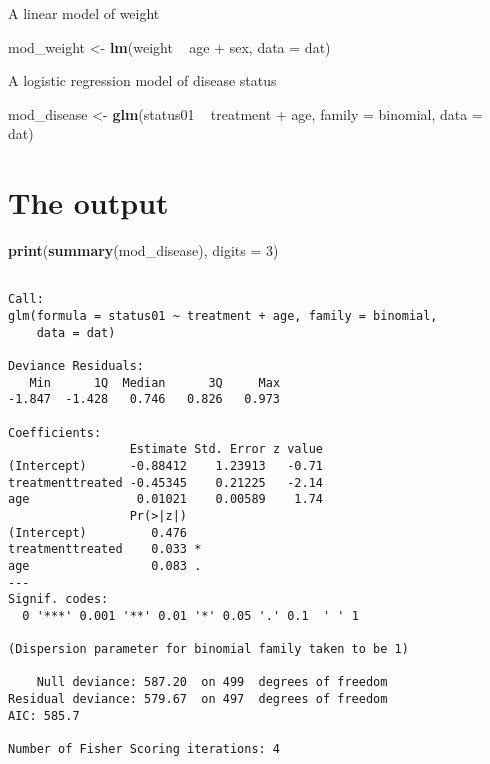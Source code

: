 \documentclass[]{tufte-handout}
\newenvironment{Shaded}{}{}
\newcommand{\DataTypeTok}[1]{\textcolor[rgb]{0.56,0.13,0.00}{#1}}
\newcommand{\DecValTok}[1]{\textcolor[rgb]{0.25,0.63,0.44}{#1}}
\newcommand{\KeywordTok}[1]{\textcolor[rgb]{0.00,0.44,0.13}{\textbf{#1}}}
\newcommand{\NormalTok}[1]{#1}
\newcommand{\OperatorTok}[1]{\textcolor[rgb]{0.40,0.40,0.40}{#1}}
\newcommand{\StringTok}[1]{\textcolor[rgb]{0.25,0.44,0.63}{#1}}
\begin{document}
A linear model of weight

\begin{Shaded}
\begin{Highlighting}[]
\NormalTok{mod_weight <-}\StringTok{ }\KeywordTok{lm}\NormalTok{(weight }\OperatorTok{~}\StringTok{ }\NormalTok{age }\OperatorTok{+}\StringTok{ }\NormalTok{sex, }\DataTypeTok{data =}\NormalTok{ dat)}
\end{Highlighting}
\end{Shaded}

A logistic regression model of disease status

\begin{Shaded}
\begin{Highlighting}[]
\NormalTok{mod_disease <-}\StringTok{ }\KeywordTok{glm}\NormalTok{(status01 }\OperatorTok{~}\StringTok{ }\NormalTok{treatment }\OperatorTok{+}\StringTok{ }\NormalTok{age, }
    \DataTypeTok{family =}\NormalTok{ binomial, }\DataTypeTok{data =}\NormalTok{ dat)}
\end{Highlighting}
\end{Shaded}

\hypertarget{the-output}{%
\section{The output}\label{the-output}}

\begin{Shaded}
\begin{Highlighting}[]
\KeywordTok{print}\NormalTok{(}\KeywordTok{summary}\NormalTok{(mod_disease), }\DataTypeTok{digits =} \DecValTok{3}\NormalTok{)}
\end{Highlighting}
\end{Shaded}

\begin{verbatim}

Call:
glm(formula = status01 ~ treatment + age, family = binomial, 
    data = dat)

Deviance Residuals: 
   Min      1Q  Median      3Q     Max  
-1.847  -1.428   0.746   0.826   0.973  

Coefficients:
                 Estimate Std. Error z value
(Intercept)      -0.88412    1.23913   -0.71
treatmenttreated -0.45345    0.21225   -2.14
age               0.01021    0.00589    1.74
                 Pr(>|z|)  
(Intercept)         0.476  
treatmenttreated    0.033 *
age                 0.083 .
---
Signif. codes:  
  0 '***' 0.001 '**' 0.01 '*' 0.05 '.' 0.1  ' ' 1

(Dispersion parameter for binomial family taken to be 1)

    Null deviance: 587.20  on 499  degrees of freedom
Residual deviance: 579.67  on 497  degrees of freedom
AIC: 585.7

Number of Fisher Scoring iterations: 4
\end{verbatim}
\end{document}
